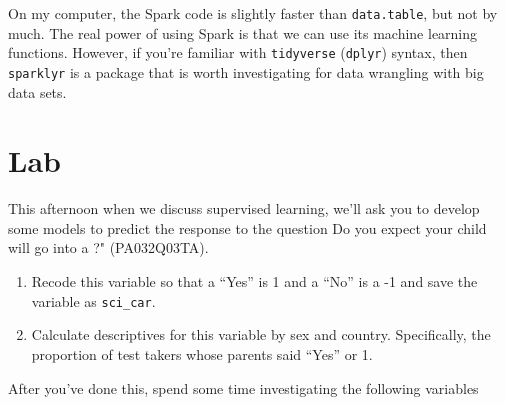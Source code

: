 \documentclass[
]{book}
\begin{document}
On my computer, the Spark code is slightly faster than \texttt{data.table}, but not by much. The real power of using Spark is that we can use its machine learning functions. However, if you're familiar with \texttt{tidyverse} (\texttt{dplyr}) syntax, then \texttt{sparklyr} is a package that is worth investigating for data wrangling with big data sets.

\hypertarget{lab}{%
\section{Lab}\label{lab}}

This afternoon when we discuss supervised learning, we'll ask you to develop some models to predict the response to the question Do you expect your child will go into a ?" (PA032Q03TA).

\begin{enumerate}
\def\labelenumi{\arabic{enumi}.}
\item
  Recode this variable so that a ``Yes'' is 1 and a ``No'' is a -1 and save the variable as \texttt{sci\_car}.
\item
  Calculate descriptives for this variable by sex and country. Specifically, the proportion of test takers whose parents said ``Yes'' or 1.
\end{enumerate}

After you've done this, spend some time investigating the following variables
\end{document}
